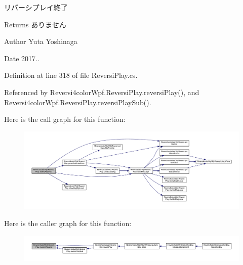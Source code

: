 リバーシプレイ終了 

\begin{DoxyReturn}{Returns}
ありません 
\end{DoxyReturn}
\begin{DoxyAuthor}{Author}
Yuta Yoshinaga 
\end{DoxyAuthor}
\begin{DoxyDate}{Date}
2017.. 
\end{DoxyDate}


Definition at line 318 of file Reversi\+Play.\+cs.



Referenced by Reversi4color\+Wpf.\+Reversi\+Play.\+reversi\+Play(), and Reversi4color\+Wpf.\+Reversi\+Play.\+reversi\+Play\+Sub().

Here is the call graph for this function\+:
\nopagebreak
\begin{figure}[H]
\begin{center}
\leavevmode
\includegraphics[width=350pt]{class_reversi4color_wpf_1_1_reversi_play_a870220856af57a48fc1527e59a552171_cgraph}
\end{center}
\end{figure}
Here is the caller graph for this function\+:
\nopagebreak
\begin{figure}[H]
\begin{center}
\leavevmode
\includegraphics[width=350pt]{class_reversi4color_wpf_1_1_reversi_play_a870220856af57a48fc1527e59a552171_icgraph}
\end{center}
\end{figure}
\mbox{\label{class_reversi4color_wpf_1_1_reversi_play_ab33ac6590dea7b86e1fcc0d011353564}} 
